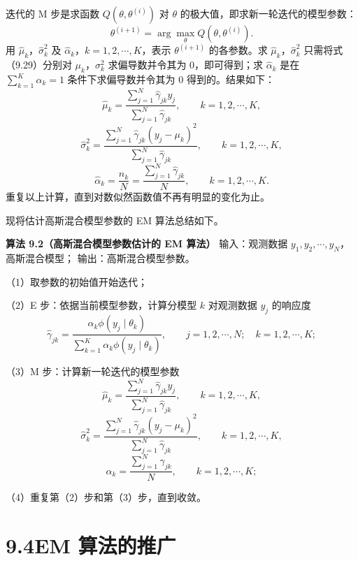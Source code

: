 \documentclass[UTF8, 12pt, fontset=fandol, oneside]{ctexart}
\begin{document}
迭代的 M 步是求函数 $Q(\theta,\theta^{(i)})$ 对 $\theta$ 的极大值，即求新一轮迭代的模型参数：
\[
  \theta^{(i+1)}=\arg\max_{\theta}Q(\theta,\theta^{(i)}).
\]
用 $\hat{\mu}_k$，$\hat{\sigma}_k^2$ 及 $\hat{\alpha}_k$，$k=1,2,\cdots,K$，表示 $\theta^{(i+1)}$ 的各参数。求 $\hat{\mu}_k$，$\hat{\sigma}_k^2$ 只需将式（9.29）分别对 $\mu_k$，$\sigma_k^2$ 求偏导数并令其为 0，即可得到；求 $\hat{\alpha}_k$ 是在 $\sum_{k=1}^K\alpha_k=1$ 条件下求偏导数并令其为 0 得到的。结果如下：
\begin{equation}
  \hat{\mu}_k=
  \frac{\sum_{j=1}^N\hat{\gamma}_{jk}y_j}
  {\sum_{j=1}^N\hat{\gamma}_{jk}},
  \qquad k=1,2,\cdots,K,
  \tag{9.30}
\end{equation}
\begin{equation}
  \hat{\sigma}_k^2=
  \frac{\sum_{j=1}^N\hat{\gamma}_{jk}(y_j-\mu_k)^2}
  {\sum_{j=1}^N\hat{\gamma}_{jk}},
  \qquad k=1,2,\cdots,K,
  \tag{9.31}
\end{equation}
\begin{equation}
  \hat{\alpha}_k=\frac{n_k}{N}
  =\frac{\sum_{j=1}^N\hat{\gamma}_{jk}}{N},
  \qquad k=1,2,\cdots,K.
  \tag{9.32}
\end{equation}
重复以上计算，直到对数似然函数值不再有明显的变化为止。

现将估计高斯混合模型参数的 EM 算法总结如下。

\noindent\textbf{算法 9.2（高斯混合模型参数估计的 EM 算法）}\quad
输入：观测数据 $y_1,y_2,\cdots,y_N$，高斯混合模型；
输出：高斯混合模型参数。

（1）取参数的初始值开始迭代；

（2）E 步：依据当前模型参数，计算分模型 $k$ 对观测数据 $y_j$ 的响应度
\[
  \hat{\gamma}_{jk}=
  \frac{\alpha_k\phi(y_j\mid\theta_k)}
  {\sum_{k=1}^K\alpha_k\phi(y_j\mid\theta_k)},
  \qquad j=1,2,\cdots,N;\quad k=1,2,\cdots,K;
\]

（3）M 步：计算新一轮迭代的模型参数
\[
  \hat{\mu}_k=
  \frac{\sum_{j=1}^N\hat{\gamma}_{jk}y_j}
  {\sum_{j=1}^N\hat{\gamma}_{jk}},
  \qquad k=1,2,\cdots,K,
\]
\[
  \hat{\sigma}_k^2=
  \frac{\sum_{j=1}^N\hat{\gamma}_{jk}(y_j-\mu_k)^2}
  {\sum_{j=1}^N\hat{\gamma}_{jk}},
  \qquad k=1,2,\cdots,K,
\]
\[
  \hat{\alpha}_k=\frac{\sum_{j=1}^N\hat{\gamma}_{jk}}{N},
  \qquad k=1,2,\cdots,K;
\]

（4）重复第（2）步和第（3）步，直到收敛。

\section*{9.4\quad EM 算法的推广}
\end{document}
